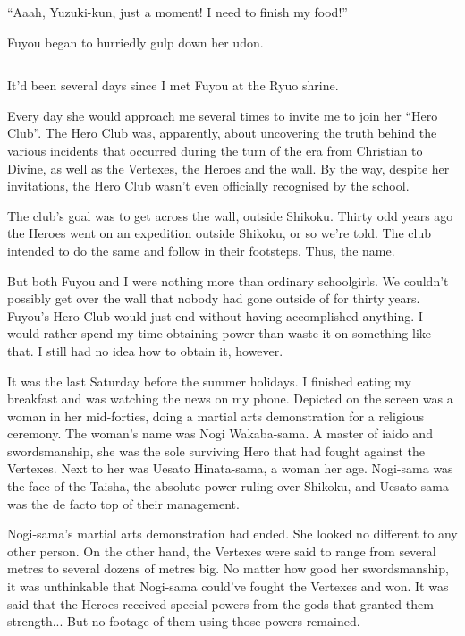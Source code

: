 ``Aaah, Yuzuki-kun, just a moment! I need to finish my food!''

Fuyou began to hurriedly gulp down her udon.

\vspace{\baselineskip}
\hrule
\vspace{\baselineskip}

It'd been several days since I met Fuyou at the Ryuo shrine.

Every day she would approach me several times to invite me to join her ``Hero Club''. The Hero Club was, apparently, about uncovering the truth behind the various incidents that occurred during the turn of the era from Christian to Divine, as well as the Vertexes, the Heroes and the wall. By the way, despite her invitations, the Hero Club wasn't even officially recognised by the school.

The club's goal was to get across the wall, outside Shikoku. Thirty odd years ago the Heroes went on an expedition outside Shikoku, or so we're told. The club intended to do the same and follow in their footsteps. Thus, the name.

But both Fuyou and I were nothing more than ordinary schoolgirls. We couldn't possibly get over the wall that nobody had gone outside of for thirty years. Fuyou's Hero Club would just end without having accomplished anything. I would rather spend my time obtaining power than waste it on something like that. I still had no idea how to obtain it, however.

It was the last Saturday before the summer holidays. I finished eating my breakfast and was watching the news on my phone. Depicted on the screen was a woman in her mid-forties, doing a martial arts demonstration for a religious ceremony. The woman's name was Nogi Wakaba-sama. A master of iaido and swordsmanship, she was the sole surviving Hero that had fought against the Vertexes. Next to her was Uesato Hinata-sama, a woman her age. Nogi-sama was the face of the Taisha, the absolute power ruling over Shikoku, and Uesato-sama was the de facto top of their management.

Nogi-sama's martial arts demonstration had ended. She looked no different to any other person. On the other hand, the Vertexes were said to range from several metres to several dozens of metres big. No matter how good her swordsmanship, it was unthinkable that Nogi-sama could've fought the Vertexes and won. It was said that the Heroes received special powers from the gods that granted them strength... But no footage of them using those powers remained.

